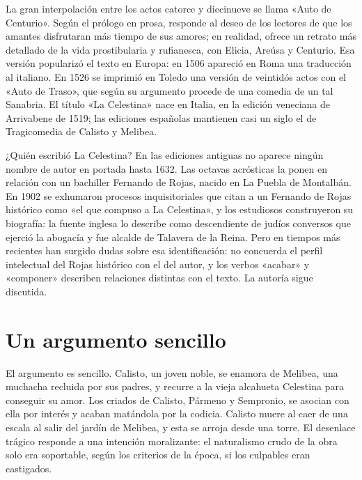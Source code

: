 \documentclass{book}
\begin{document}
La gran interpolación entre los actos catorce y diecinueve se llama «Auto de Centurio». Según el prólogo en prosa, responde al deseo de los lectores de que los amantes disfrutaran más tiempo de sus amores; en realidad, ofrece un retrato más detallado de la vida prostibularia y rufianesca, con Elicia, Areúsa y Centurio. Esa versión popularizó el texto en Europa: en 1506 apareció en Roma una traducción al italiano. En 1526 se imprimió en Toledo una versión de veintidós actos con el «Auto de Traso», que según su argumento procede de una comedia de un tal Sanabria. El título «La Celestina» nace en Italia, en la edición veneciana de Arrivabene de 1519; las ediciones españolas mantienen casi un siglo el de Tragicomedia de Calisto y Melibea.


¿Quién escribió La Celestina?
En las ediciones antiguas no aparece ningún nombre de autor en portada hasta 1632. Las octavas acrósticas la ponen en relación con un bachiller Fernando de Rojas, nacido en La Puebla de Montalbán. En 1902 se exhumaron procesos inquisitoriales que citan a un Fernando de Rojas histórico como «el que compuso a La Celestina», y los estudiosos construyeron su biografía: la fuente inglesa lo describe como descendiente de judíos conversos que ejerció la abogacía y fue alcalde de Talavera de la Reina. Pero en tiempos más recientes han surgido dudas sobre esa identificación: no concuerda el perfil intelectual del Rojas histórico con el del autor, y los verbos «acabar» y «componer» describen relaciones distintas con el texto. La autoría sigue discutida.


\section{Un argumento sencillo}

El argumento es sencillo. Calisto, un joven noble, se enamora de Melibea, una muchacha recluida por sus padres, y recurre a la vieja alcahueta Celestina para conseguir su amor. Los criados de Calisto, Pármeno y Sempronio, se asocian con ella por interés y acaban matándola por la codicia. Calisto muere al caer de una escala al salir del jardín de Melibea, y esta se arroja desde una torre. El desenlace trágico responde a una intención moralizante: el naturalismo crudo de la obra solo era soportable, según los criterios de la época, si los culpables eran castigados.
\end{document}
